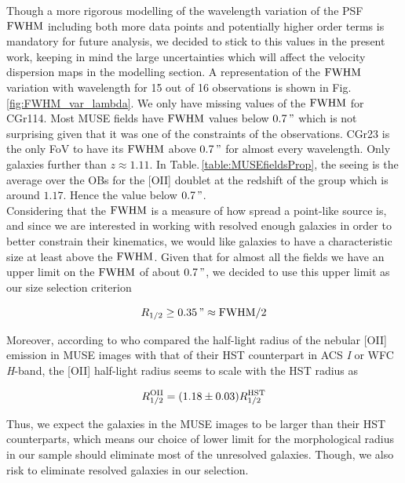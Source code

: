 Though a more rigorous modelling of the wavelength variation of the PSF $\rm{FWHM}$ including both more data points and potentially higher order terms is mandatory for future analysis, we decided to stick to this values in the present work, keeping in mind the large uncertainties which will affect the velocity dispersion maps in the modelling section. A representation of the $\rm{FWHM}$ variation with wavelength for 15 out of 16 observations is shown in Fig.\,\ref{fig:FWHM_var_lambda}. We only have missing values of the $\rm{FWHM}$ for CGr114. Most MUSE fields have $\rm{FWHM}$ values below $\SI{0.7}{"}$ which is not surprising given that it was one of the constraints of the observations. CGr23 is the only FoV to have its $\rm{FWHM}$ above $\SI{0.7}{"}$ for almost every wavelength. Only galaxies further than $z \approx 1.11$. In Table.\,\ref{table:MUSEfieldsProp}, the seeing is the average over the OBs for the [OII] doublet at the redshift of the group which is around $1.17$. Hence the value below $\SI{0.7}{"}$. \\

Considering that the $\rm{FWHM}$ is a measure of how spread a point-like source is, and since we are interested in working with resolved enough galaxies in order to better constrain their kinematics, we would like galaxies to have a characteristic size at least above the $\rm{FWHM}$. Given that for almost all the fields we have an upper limit on the $\rm{FWHM}$ of about $\SI{0.7}{"}$, we decided to use this upper limit as our size selection criterion

\begin{equation}
	R_{1/2} \geq \SI{0.35}{"} \approx \rm{FWHM}/2
\end{equation}

Moreover, according to  who compared the half-light radius of the nebular [OII] emission in MUSE images with that of their HST counterpart in ACS \textit{I} or WFC \textit{H}-band, the [OII] half-light radius seems to scale with the HST radius as 

\begin{equation}
	R_{1/2}^{\rm{OII}} = (1.18 \pm 0.03) R_{1/2}^{\rm{HST}}
\end{equation}

Thus, we expect the galaxies in the MUSE images to be larger than their HST counterparts, which means our choice of lower limit for the morphological radius in our sample should eliminate most of the unresolved galaxies. Though, we also risk to eliminate resolved galaxies in our selection.

